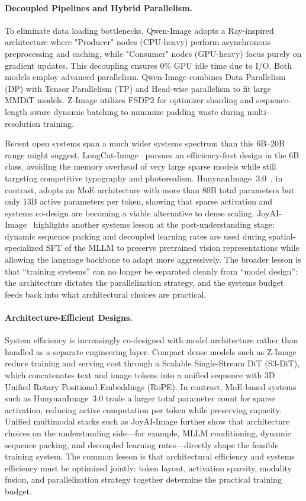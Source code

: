 \documentclass{llmxive}
\begin{document}
\paragraph{Decoupled Pipelines and Hybrid Parallelism.}
To eliminate data loading bottlenecks, Qwen-Image adopts a Ray-inspired architecture where "Producer" nodes (CPU-heavy) perform asynchronous preprocessing and caching, while "Consumer" nodes (GPU-heavy) focus purely on gradient updates. This decoupling ensures 0\% GPU idle time due to I/O. Both models employ advanced parallelism. Qwen-Image combines Data Parallelism (DP) with Tensor Parallelism (TP) and Head-wise parallelism to fit large MMDiT models. Z-Image utilizes FSDP2 for optimizer sharding and sequence-length aware dynamic batching to minimize padding waste during multi-resolution training.

Recent open systems span a much wider systems spectrum than this 6B--20B range might suggest. LongCat-Image~\citep{team2025longcat} pursues an efficiency-first design in the 6B class, avoiding the memory overhead of very large sparse models while still targeting competitive typography and photorealism. HunyuanImage~3.0~\citep{cao2025hunyuanimage}, in contrast, adopts an MoE architecture with more than 80B total parameters but only 13B active parameters per token, showing that sparse activation and systems co-design are becoming a viable alternative to dense scaling. JoyAI-Image~\citep{jdjoyaiimage} highlights another systems lesson at the post-understanding stage: dynamic sequence packing and decoupled learning rates are used during spatial-specialized SFT of the MLLM to preserve pretrained vision representations while allowing the language backbone to adapt more aggressively. The broader lesson is that ``training systems'' can no longer be separated cleanly from ``model design'': the architecture dictates the parallelization strategy, and the systems budget feeds back into what architectural choices are practical.

\paragraph{Architecture-Efficient Designs.}
System efficiency is increasingly co-designed with model architecture rather than handled as a separate engineering layer. Compact dense models such as Z-Image reduce training and serving cost through a Scalable Single-Stream DiT (S3-DiT), which concatenates text and image tokens into a unified sequence with 3D Unified Rotary Positional Embeddings (RoPE). In contrast, MoE-based systems such as HunyuanImage~3.0 trade a larger total parameter count for sparse activation, reducing active computation per token while preserving capacity. Unified multimodal stacks such as JoyAI-Image further show that architecture choices on the understanding side---for example, MLLM conditioning, dynamic sequence packing, and decoupled learning rates---directly shape the feasible training system. The common lesson is that architectural efficiency and systems efficiency must be optimized jointly: token layout, activation sparsity, modality fusion, and parallelization strategy together determine the practical training budget.
\end{document}

